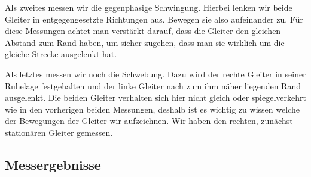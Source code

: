 \documentclass{article}
\begin{document}
          Als zweites messen wir die gegenphasige Schwingung.
          Hierbei lenken wir beide Gleiter in entgegengesetzte Richtungen aus. Bewegen sie also aufeinander zu.
          Für diese Messungen achtet man verstärkt darauf, dass die Gleiter den gleichen Abstand zum Rand haben,
          um sicher zugehen, dass man sie wirklich um die gleiche Strecke ausgelenkt hat.

          Als letztes messen wir noch die Schwebung.
          Dazu wird der rechte Gleiter in seiner Ruhelage festgehalten und der linke Gleiter nach zum ihm näher liegenden Rand ausgelenkt.
          Die beiden Gleiter verhalten sich hier nicht gleich oder spiegelverkehrt wie in den vorherigen beiden Messungen,
          deshalb ist es wichtig zu wissen welche der Bewegungen der Gleiter wir aufzeichnen.
          Wir haben den rechten, zunächst stationären Gleiter gemessen.

      \subsection{Messergebnisse}
\end{document}
